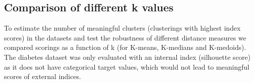 

\subsection{Comparison of different k values}
\marginnote{\textcolor{blue}{Jonas Elpelt}}
To estimate the number of meaningful clusters (clusterings with highest index scores) in the datasets and test the robustness of different distance measures we compared scorings as a function of k (for K-means, K-medians and K-medoids). The diabetes dataset was only evaluated with an internal index (silhouette score) as it does not have categorical target values, which would not lead to meaningful scores of external indices.  \\

\begin{figure}[H]
	\centering
	\qquad
	\qquad
	\qquad

\end{figure}
